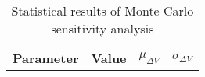 
                    \begin{table}[]
                    \centering
                    \begin{tabular}{l l l l}
                    \rowcolor[HTML]{EFEFEF} \textbf{Parameter} & \textbf{Value} & \textbf{$\mu_{\Delta V}$} & \textbf{$\sigma_{\Delta V}$} \\
                    
                    \end{tabular}
                    \caption{Statistical results of Monte Carlo sensitivity analysis}
                    \label{tab:SensitivityAnalysis}
                    \end{table}
                    